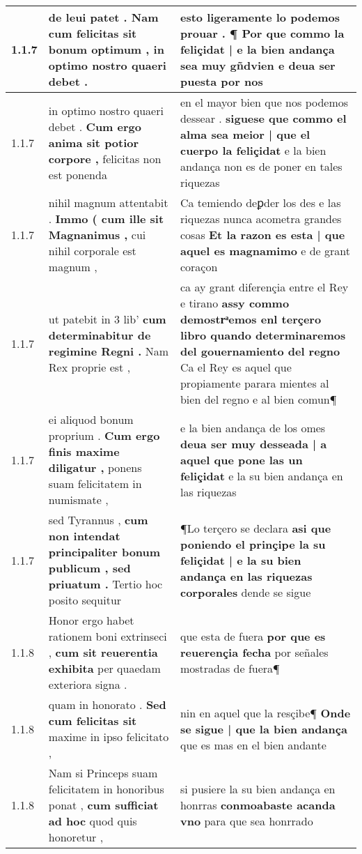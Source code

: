 \begin{tabular}{|p{1cm}|p{6.5cm}|p{6.5cm}|}
1.1.7 & de leui patet . \textbf{ Nam cum felicitas sit bonum optimum , } in optimo nostro quaeri debet . & esto ligeramente lo podemos prouar . \textbf{ ¶ Por que commo la feliçidat | e la bien andança sea muy gñdvien } e deua ser puesta por nos \\\hline
1.1.7 & in optimo nostro quaeri debet . \textbf{ Cum ergo anima sit potior corpore , } felicitas non est ponenda & en el mayor bien que nos podemos dessear . \textbf{ siguese que commo el alma sea meior | que el cuerpo la feliçidat } e la bien andança non es de poner en tales riquezas \\\hline
1.1.7 & nihil magnum attentabit . \textbf{ Immo ( cum ille sit Magnanimus , } cui nihil corporale est magnum , & Ca temiendo deꝑder los des e las riquezas nunca acometra grandes cosas \textbf{ Et la razon es esta | que aquel es magnamimo } e de grant coraçon \\\hline
1.1.7 & ut patebit in 3 lib’ \textbf{ cum determinabitur de regimine Regni . } Nam Rex proprie est , & ca ay grant diferençia entre el Rey e tirano \textbf{ assy commo demostrͣemos enl terçero libro quando determinaremos del gouernamiento del regno } Ca el Rey es aquel que propiamente parara mientes al bien del regno e al bien comun¶ \\\hline
1.1.7 & ei aliquod bonum proprium . \textbf{ Cum ergo finis maxime diligatur , } ponens suam felicitatem in numismate , & e la bien andança de los omes \textbf{ deua ser muy desseada | a aquel que pone las un feliçidat } e la su bien andança en las riquezas \\\hline
1.1.7 & sed Tyrannus , \textbf{ cum non intendat principaliter bonum publicum , sed priuatum . } Tertio hoc posito sequitur & ¶Lo terçero se declara \textbf{ asi que poniendo el prinçipe la su feliçidat | e la su bien andança en las riquezas corporales } dende se sigue \\\hline
1.1.8 & Honor ergo habet rationem boni extrinseci , \textbf{ cum sit reuerentia exhibita } per quaedam exteriora signa . & que esta de fuera \textbf{ por que es reuerençia fecha } por señales mostradas de fuera¶ \\\hline
1.1.8 & quam in honorato . \textbf{ Sed cum felicitas sit } maxime in ipso felicitato , & nin en aquel que la resçibe¶ \textbf{ Onde se sigue | que la bien andança } que es mas en el bien andante \\\hline
1.1.8 & Nam si Princeps suam felicitatem in honoribus ponat , \textbf{ cum sufficiat ad hoc } quod quis honoretur , & si pusiere la su bien andança en honrras \textbf{ conmoabaste acanda vno } para que sea honrrado \\\hline

\end{tabular}
